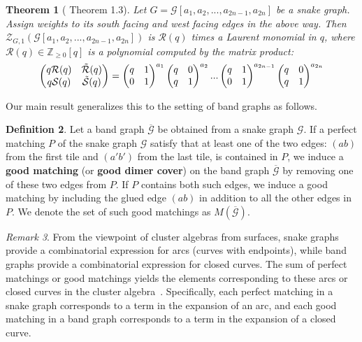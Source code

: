 \documentclass[11pt]{amsart}
\newcommand\m[1]{\begin{pmatrix}#1\end{pmatrix}}
\newtheorem{thm}{Theorem}[section]
\theoremstyle{definition}
\newtheorem{defn}[thm]{Definition}
\theoremstyle{remark}
\newtheorem{rem}[thm]{Remark}
\numberwithin{equation}{section}
\newcommand{\calG}{\mathcal{G}}
\begin{document}
\begin{thm}
[\cite{ovsienko2025qrationalsdimers} Theorem 1.3]\label{thm:weighted_snake_graph_counting}
    Let $G=\mathcal{G}[a_1,a_2,...,a_{2n-1},a_{2n}]$ be a snake graph. Assign weights to its south facing and west facing edges in the above way. Then $\mathcal{Z}_{G,1}(\mathcal{G}[a_1,a_2,...,a_{2n-1},a_{2n}])$ is $\mathcal{R}(q)$ times a Laurent monomial in $q$, where $\mathcal{R}(q)\in \mathbb{Z}_{\geq 0}[q]$ is a polynomial computed by the matrix product:
    \begin{equation}
        \begin{split}\label{eqn:simple_mtx_prod}
            \m{q\mathcal{R}(q)& \Tilde{\mathcal{R}}(q)\\q\mathcal{S}(q)&\Tilde{\mathcal{S}}(q)}&= \m{q& 1\\0&1}^{a_1}\m{q& 0\\q&1}^{a_2}...\m{q& 1\\0&1}^{a_{2n-1}}\m{q& 0\\q&1}^{a_{2n}}\\
        \end{split}
    \end{equation}    
\end{thm}

Our main result generalizes this to the setting of band graphs as follows.

\begin{defn}
    Let a band graph $\overline{\calG}$ be obtained from a snake graph $\calG$. If a perfect matching $P$ of the snake graph $\calG$ satisfy that at least one of the two edges: $(ab)$ from the first tile and $(a'b')$ from the last tile, is contained in $P$, we induce a \textbf{good matching} (or \textbf{good dimer cover}) on the band graph $\overline{\mathcal{G}}$ by removing one of these two edges from $P$. If $P$ contains both such edges, we induce a good matching by including the glued edge $(ab)$ in addition to all the other edges in $P$. We denote the set of such good matchings as  $M(\overline{\mathcal{G}})$.
\end{defn}

\begin{rem}
    From the viewpoint of cluster algebras from surfaces, snake graphs provide a combinatorial expression for arcs (curves with endpoints), while band graphs provide a combinatorial expression for closed curves. The sum of perfect matchings or good matchings yields the elements corresponding to these arcs or closed curves in the cluster algebra~\cite{musiker2011positivity,musiker2013bases}. Specifically, each perfect matching in a snake graph corresponds to a term in the expansion of an arc, and each good matching in a band graph corresponds to a term in the expansion of a closed curve.
\end{rem}
\end{document}
